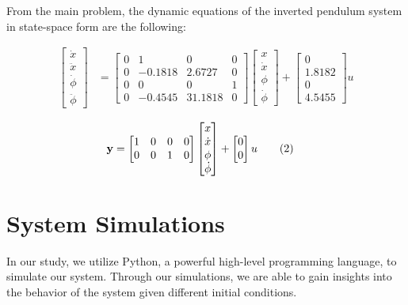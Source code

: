 \documentclass[11pt,twocolumn,twoside,lineno]{pnas-new}
\begin{document}
From the main problem, the dynamic equations of the inverted pendulum system in state-space form are the following:

\begin{align}
\begin{bmatrix}
  \dot{x} \\ \ddot{x} \\ \dot{\phi} \\ \ddot{\phi}
\end{bmatrix} &=
\begin{bmatrix}
  0 & 1 & 0 & 0 \\
  0 & -0.1818 & 2.6727 & 0 \\
  0 & 0 & 0 & 1 \\
  0 & -0.4545 & 31.1818 & 0
\end{bmatrix}
\begin{bmatrix}
  x \\ \dot{x} \\ \phi \\ \dot{\phi}
\end{bmatrix} +
\begin{bmatrix}
  0 \\ 1.8182 \\ 0 \\ 4.5455
\end{bmatrix}u \tag{1}
\end{align}

\begin{align}
{\bf y} &= \begin{bmatrix}
  1 & 0 & 0 & 0 \\
  0 & 0 & 1 & 0
\end{bmatrix}
\begin{bmatrix}
  x \\ \dot{x} \\ \phi \\ \dot{\phi}
\end{bmatrix} +
\begin{bmatrix}
  0 \\ 0
\end{bmatrix}u \tag{2}
\end{align}

\newpage

\section{System Simulations}
In our study, we utilize Python, a powerful high-level programming language, to simulate our system. Through our simulations, we are able to gain insights into the behavior of the system given different initial conditions.
\end{document}
